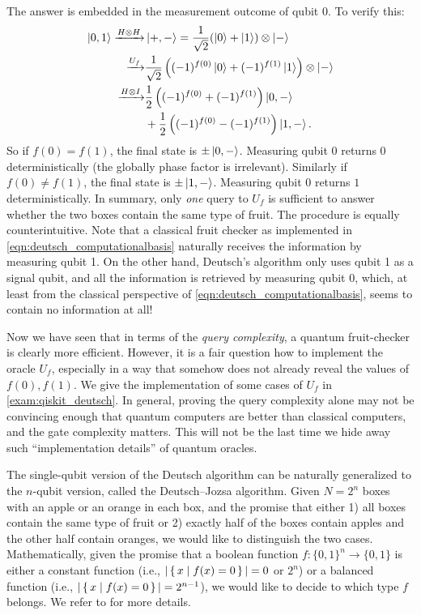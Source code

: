 The answer is embedded in the measurement outcome of qubit $0$.
To verify this:
\begin{equation}
\begin{split}
\ket{0,1} \xrightarrow{H\otimes H}& \ket{+,-}=\frac{1}{\sqrt{2}}(\ket{0}+\ket{1})\otimes\ket{-}\\
\xrightarrow{U_f}&\frac{1}{\sqrt{2}}\left((-1)^{f(0)}\ket{0}+(-1)^{f(1)}\ket{1}\right)\otimes\ket{-}\\
\xrightarrow{H\otimes I} &\frac12\left((-1)^{f(0)}+(-1)^{f(1)}\right)\ket{0,-}\\
&+\frac12\left((-1)^{f(0)}-(-1)^{f(1)}\right)\ket{1,-}.
\end{split}
\end{equation}
So if $f(0)=f(1)$, the final state is $\pm\ket{0,-}$. Measuring qubit $0$ returns $0$ deterministically (the globally phase factor is irrelevant). Similarly if $f(0)\ne f(1)$, the final state is $\pm\ket{1,-}$. Measuring qubit $0$ returns $1$ deterministically. In summary, only \emph{one} query to $U_f$ is sufficient to answer whether the two boxes contain the same type of fruit. 
The procedure is equally counterintuitive. Note that a classical fruit checker as implemented in \cref{eqn:deutsch_computationalbasis} naturally receives the information by measuring qubit 1. 
On the other hand, Deutsch's algorithm only uses qubit 1 as a signal qubit, and all the information is retrieved by measuring qubit 0, which, at least from the classical perspective of \cref{eqn:deutsch_computationalbasis}, seems to contain no information at all!

Now we have seen that in terms of the \emph{query complexity}, a quantum fruit-checker is clearly more efficient.
However, it is a fair question how to implement the oracle $U_f$, especially in a way that somehow does not already reveal the values of $f(0),f(1)$.
We give the implementation of some cases of $U_f$ in \cref{exam:qiskit_deutsch}.
In general, proving the query complexity alone may not be convincing enough that quantum computers are better than classical computers, and the gate complexity matters. 
This will not be the last time we hide away such ``implementation details'' of quantum oracles.

\begin{rem}
The single-qubit version of the Deutsch algorithm can be naturally generalized to the $n$-qubit version, called the Deutsch--Jozsa algorithm. Given $N=2^n$ boxes with an apple or an orange in each box, and the promise that either 1) all boxes contain the same type of fruit or 2) exactly half of the boxes contain apples and the other half contain oranges, we would like to distinguish the two cases. Mathematically, given the promise that a boolean function $f:\{0,1\}^n\to\{0,1\}$ is either a constant function (i.e., $|\set{x|f(x)=0}|=0$ or $2^n$) or a balanced function (i.e., $|\set{x|f(x)=0}|=2^{n-1}$), we would like to decide to which type $f$ belongs. We refer to \cite[Section 1.4.4]{NielsenChuang2000} for more details.
\end{rem}

